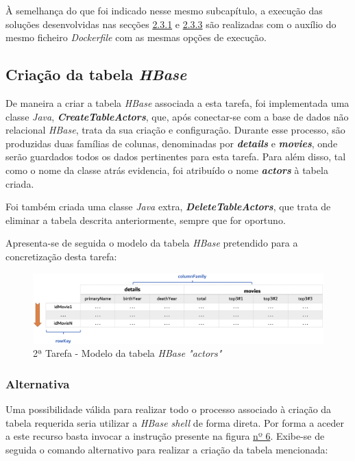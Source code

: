 \documentclass[a4paper]{report}
\begin{document}
{	À semelhança do que foi indicado nesse mesmo subcapítulo, a execução das soluções desenvolvidas nas secções \hyperref[subsec:Task2-1]{2.3.1} e \hyperref[subsec:Task2-3]{2.3.3} são realizadas com o auxílio do mesmo ficheiro \textit{Dockerfile} com as mesmas opções de execução.
		
		\subsection{Criação da tabela \textit{HBase}} \label{subsec:Task2-1}
		De maneira a criar a tabela \textit{HBase} associada a esta tarefa, foi implementada uma classe \textit{Java}, \textbf{\textit{CreateTableActors}}, que, após conectar-se com a base de dados não relacional \textit{HBase}, trata da sua criação e configuração.
		Durante esse processo, são produzidas duas famílias de colunas, denominadas por \textbf{\textit{details}} e \textbf{\textit{movies}}, onde serão guardados todos os dados pertinentes para esta tarefa. Para além disso, tal como o nome da classe atrás evidencia, foi atribuído o nome \textbf{\textit{actors}} à tabela criada.

		Foi também criada uma classe \textit{Java} extra, \textbf{\textit{DeleteTableActors}}, que trata de eliminar a tabela descrita anteriormente, sempre que for oportuno.
        
        Apresenta-se de seguida o modelo da tabela \textit{HBase} pretendido para a concretização desta tarefa:
        \begin{figure}[H]
            \centering
            \includegraphics[width=1.0\textwidth]{Imagens/2ª Tarefa - Tabela Hbase.png}
            \caption{2ª Tarefa - Modelo da tabela \textit{HBase "actors"}}
            \label{fig:13}
        \end{figure}

			\subsubsection{Alternativa}
			Uma possibilidade válida para realizar todo o processo associado à criação da tabela requerida seria utilizar a \textit{HBase shell} de forma direta. Por forma a aceder a este recurso basta invocar a instrução presente na figura \hyperref[fig:6]{nº 6}.
			Exibe-se de seguida o comando alternativo para realizar a criação da tabela mencionada:

}
\end{document}
